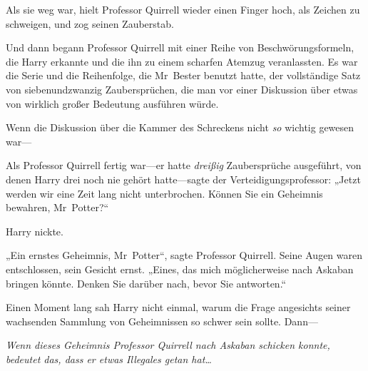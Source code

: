 Als sie weg war, hielt Professor Quirrell wieder einen Finger hoch, als Zeichen zu schweigen, und zog seinen Zauberstab.

Und dann begann Professor Quirrell mit einer Reihe von Beschwörungsformeln, die Harry erkannte und die ihn zu einem scharfen Atemzug veranlassten. Es war die Serie und die Reihenfolge, die Mr~Bester benutzt hatte, der vollständige Satz von siebenundzwanzig Zaubersprüchen, die man vor einer Diskussion über etwas von wirklich großer Bedeutung ausführen würde.

Wenn die Diskussion über die Kammer des Schreckens nicht \emph{so} wichtig gewesen war—

Als Professor Quirrell fertig war—er hatte \emph{dreißig} Zaubersprüche ausgeführt, von denen Harry drei noch nie gehört hatte—sagte der Verteidigungsprofessor: „Jetzt werden wir eine Zeit lang nicht unterbrochen. Können Sie ein Geheimnis bewahren, Mr~Potter?“

Harry nickte.

„Ein ernstes Geheimnis, Mr~Potter“, sagte Professor Quirrell. Seine Augen waren entschlossen, sein Gesicht ernst. „Eines, das mich möglicherweise nach Askaban bringen könnte. Denken Sie darüber nach, bevor Sie antworten.“

Einen Moment lang sah Harry nicht einmal, warum die Frage angesichts seiner wachsenden Sammlung von Geheimnissen so schwer sein sollte. Dann—

\emph{Wenn dieses Geheimnis Professor Quirrell nach Askaban schicken konnte, bedeutet das, dass er etwas Illegales getan hat…}

